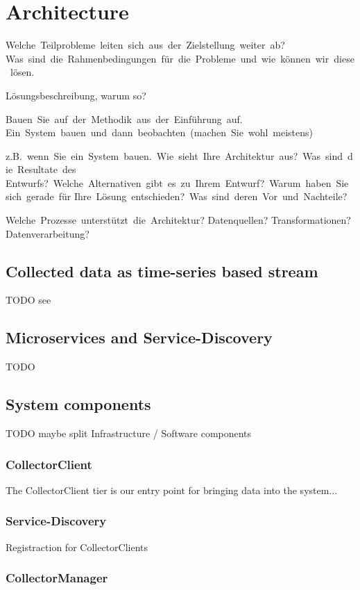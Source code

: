 \chapter{Architecture}

Welche Teilprobleme leiten sich aus der Zielstellung weiter ab?
Was sind die Rahmenbedingungen für die Probleme und wie können wir diese lösen.

Lösungsbeschreibung, warum so?

Bauen Sie auf der Methodik aus der Einführung auf.
Ein System bauen und dann beobachten (machen Sie wohl meistens)

z.B. wenn Sie ein System bauen. Wie sieht Ihre Architektur aus? Was sind die Resultate des
Entwurfs? Welche Alternativen gibt es zu Ihrem Entwurf? Warum haben Sie sich gerade für
Ihre Lösung entschieden? Was sind deren Vor­ und Nachteile?

Welche Prozesse unterstützt die Architektur?
Datenquellen?
Transformationen?
Datenverarbeitung?

\section{Collected data as time-series based stream}

TODO see \cite{Klepp16}
\section{Microservices and Service-Discovery}

TODO
\section{System components}

TODO maybe split Infrastructure / Software components

\subsection{CollectorClient}

The CollectorClient tier is our entry point for bringing data into the system...

\subsection{Service-Discovery}

Registraction for CollectorClients

\subsection{CollectorManager}

